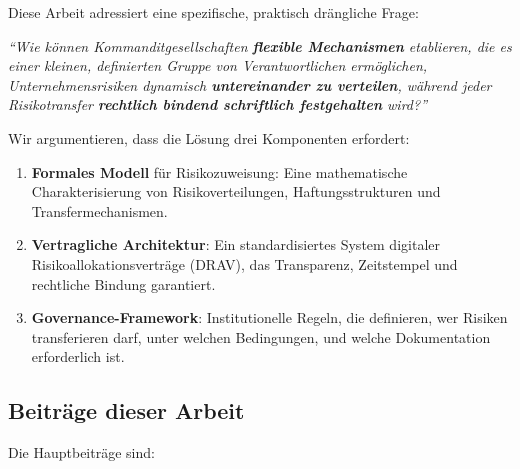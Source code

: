 \documentclass[a4paper,12pt]{article}
\theoremstyle{definition}
\begin{document}
Diese Arbeit adressiert eine spezifische, praktisch drängliche Frage:

\begin{center}
\textit{``Wie können Kommanditgesellschaften \textbf{flexible Mechanismen} etablieren, die es einer kleinen, definierten Gruppe von Verantwortlichen ermöglichen, Unternehmensrisiken dynamisch \textbf{untereinander zu verteilen}, während jeder Risikotransfer \textbf{rechtlich bindend schriftlich festgehalten} wird?''}
\end{center}

Wir argumentieren, dass die Lösung drei Komponenten erfordert:

\begin{enumerate}
    \item \textbf{Formales Modell} für Risikozuweisung: Eine mathematische Charakterisierung von Risikoverteilungen, Haftungsstrukturen und Transfermechanismen.
    
    \item \textbf{Vertragliche Architektur}: Ein standardisiertes System digitaler Risikoallokationsverträge (DRAV), das Transparenz, Zeitstempel und rechtliche Bindung garantiert.
    
    \item \textbf{Governance-Framework}: Institutionelle Regeln, die definieren, wer Risiken transferieren darf, unter welchen Bedingungen, und welche Dokumentation erforderlich ist.
\end{enumerate}

\subsection{Beiträge dieser Arbeit}

Die Hauptbeiträge sind:
\end{document}
